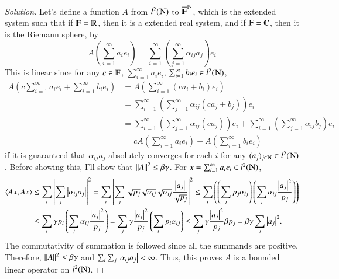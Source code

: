\documentclass[a4paper, 12pt]{article}
\theoremstyle{Mydefinition}
\theoremstyle{Mytheorem}
\begin{document}
\begin{proof}[Solution]
Let's define a function $A$ from $l^2(\varmathbb{N})$ to $\overline{\varmathbb{F}}^{\varmathbb{N}}$, which is the extended system such that if $\varmathbb{F} = \varmathbb{R}$, then it is a extended real system, and if $\varmathbb{F} = \varmathbb{C}$, then it is the Riemann sphere, by
\begin{equation}
    A\left(\sum_{i=1}^\infty a_i e_i\right) = \sum_{i=1}^\infty \left(\sum_{j=1}^\infty \alpha_{ij}a_j\right) e_i
\end{equation}
This is linear since for any $c\in \varmathbb{F}$, $\sum_{i=1}^\infty a_i e_i$, $\sum_{i=1}^\infty b_i e_i\in l^2(\varmathbb{N})$,
\begin{equation}
\begin{split}
    A\left(c\sum_{i=1}^\infty a_i e_i + \sum_{i=1}^\infty b_i e_i\right) &= A\left(\sum_{i=1}^\infty (ca_i+b_i) e_i\right)\\
    &=\sum_{i=1}^\infty \left(\sum_{j=1}^\infty \alpha_{ij}(ca_j+b_j)\right) e_i \\
    &=\sum_{i=1}^\infty \left(\sum_{j=1}^\infty \alpha_{ij}(ca_j)\right) e_i + \sum_{i=1}^\infty \left(\sum_{j=1}^\infty \alpha_{ij}b_j\right) e_i \\
    &= cA\left(\sum_{i=1}^\infty a_i e_i\right) + A\left(\sum_{i=1}^\infty b_i e_i\right)
\end{split}
\end{equation}
if it is guaranteed that $\alpha_{ij}a_j$ absolutely converges for each $i$ for any $(a_j)_{j\in \varmathbb{N}}\in l^2(\varmathbb{N})$. Before showing this, I'll show that $\norm{A}^2\leq \beta\gamma$. For $x = \sum_{i=1}^\infty a_i e_i\in l^2(\varmathbb{N})$,
\begin{equation}
\begin{split}
       \langle Ax, Ax\rangle &\leq  \sum_i\abs{\sum_{j} \abs{\alpha_{ij}a_j}}^2 = \sum_i\abs{\sum_{j} \sqrt{p_j}\sqrt{\alpha_{ij}}\sqrt{\alpha_{ij}}\frac{\abs{a_j}}{\sqrt{p_j}}}^2\leq \sum_i \left(\left(\sum_{j} p_j\alpha_{ij}\right)\left(\sum_{j} \alpha_{ij}\frac{\abs{a_j}^2}{p_j}\right)\right) \\
       &\leq \sum_i \gamma p_i \left(\sum_{j} \alpha_{ij}\frac{\abs{a_j}^2}{p_j}\right) = \sum_j \gamma \frac{\abs{a_j}^2}{p_j} \left(\sum_{i} p_i\alpha_{ij}\right)\leq \sum_j \gamma \frac{\abs{a_j}^2}{p_j} \beta p_j = \beta\gamma \sum_j\abs{a_j}^2.
\end{split}
\end{equation}
The commutativity of summation is followed since all the summands are positive. Therefore, $\norm{A}^2\leq \beta\gamma $ and $\sum_{i}\sum_{j} \abs{\alpha_{ij}a_j} < \infty$. Thus, this proves $A$ is a bounded linear operator on $l^2(\varmathbb{N})$.
\end{proof}
\end{document}
